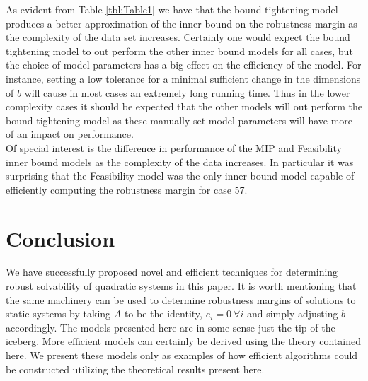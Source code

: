 \documentclass[11pt]{article}
\theoremstyle{plain}
\theoremstyle{definition}
\theoremstyle{remark}
\begin{document}
As evident from Table \ref{tbl:Table1} we have that the bound tightening model produces a better approximation of the inner bound on the robustness margin as the complexity of the data set increases. Certainly one would expect the bound tightening model to out perform the other inner bound models for all cases, but the choice of model parameters has a big effect on the efficiency of the model. For instance, setting a low tolerance for a minimal sufficient change in the dimensions of $b$ will cause in most cases an extremely long running time. Thus in the lower complexity cases it should be expected that the other models will out perform the bound tightening model as these manually set model parameters will have more of an impact on performance. \\
Of special interest is the difference in performance of the MIP and Feasibility inner bound models as the complexity of the data increases. In particular it was surprising that the Feasibility model was the only inner bound model capable of efficiently computing the robustness margin for case 57. 


\section{Conclusion}

We have successfully proposed novel and efficient techniques for determining robust solvability of quadratic systems in this paper. It is worth mentioning that the same machinery can be used to determine robustness margins of solutions to static systems by taking $A$ to be the identity, $e_i=0 \ \forall i$ and simply adjusting $b$ accordingly. The models presented here are in some sense just the tip of the iceberg. More efficient models can certainly be derived using the theory contained here. We present these models only as examples of how efficient algorithms could be constructed utilizing the theoretical results present here. \\


\end{document}
